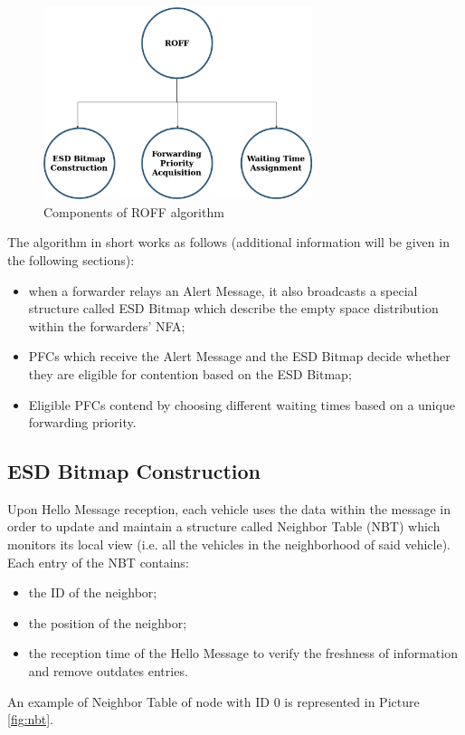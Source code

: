 		\begin{figure}[H]
			\centering
			\includegraphics[width=0.7\textwidth]{immagini/roffAlgo}
			\caption{Components of ROFF algorithm}
			\label{fig:roffAlgo}
		\end{figure}
	
		The algorithm in short works as follows (additional information will be given in the following sections):
		\begin{itemize}
			\item when a forwarder relays an Alert Message, it also broadcasts a special structure called ESD Bitmap which describe the empty space distribution within the forwarders' NFA;
			\item PFCs which receive the Alert Message and the ESD Bitmap decide whether they are eligible for contention based on the ESD Bitmap;
			\item Eligible PFCs contend by choosing different waiting times based on a unique forwarding priority.
		\end{itemize}
	
		\subsection{ESD Bitmap Construction}
			Upon Hello Message reception, each vehicle uses the data within the message in order to update and maintain a structure called Neighbor Table (NBT) which monitors its local view (i.e. all the vehicles in the neighborhood of said vehicle). Each entry of the NBT contains:
			\begin{itemize}
				\item the ID of the neighbor;
				\item the position of the neighbor;
				\item the reception time of the Hello Message to verify the freshness of information and remove outdates entries.
			\end{itemize}
			An example of Neighbor Table of node with ID 0 is represented in Picture \ref{fig:nbt}.
				
